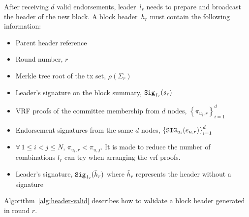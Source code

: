 \documentclass{article}
\begin{document}
After receiving $d$ valid endorsements, leader~$l_r$ needs to prepare and broadcast the header of the new block. A block header~$h_r$ must contain the following information:
\begin{itemize}
    \item Parent header reference 
    \item Round number, $r$
    \item Merkle tree root of the tx set, $\rho\left(\Sigma_r\right)$
    \item Leader's signature on the block summary, ${\tt Sig}_{\,l_r}(s_r)$
    \item VRF proofs of the committee membership from $d$ nodes, $\left\{\pi_{u_i,r}\right\}_{i=1}^d$
    \item Endorsement signatures from the same $d$ nodes, $\left\{{\tt SIG}_{u_i}(\bar{e}_{u,r})\right\}_{i=1}^d$
    \item $\forall\,1\leq i<j\leq N$, $\pi_{u_i,r}<\pi_{u,j}$. It is made to reduce the number of combinations $l_r$ can try when arranging the vrf proofs.
    \item Leader's signature, ${\tt Sig}_{\,l_r}(\bar{h}_r)$ where $\bar{h}_r$ represents the header without a signature
\end{itemize}

Algorithm~\ref{alg:header-valid} describes how to validate a block header generated in round $r$. 

\end{document}
